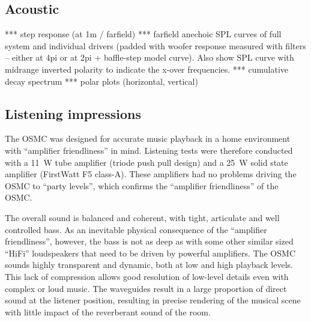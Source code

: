 \documentclass[12pt,a4paper]{article}
\begin{document}
\subsection{Acoustic}
*** step response (at 1m / farfield)
*** farfield anechoic SPL curves of full system and individual drivers (padded with woofer response measured with filters -- either at 4pi or at 2pi + baffle-step model curve). Also show SPL curve with midrange inverted polarity to indicate the x-over frequencies.
*** cumulative decay spectrum
*** polar plots (horizontal, vertical)


\subsection{Listening impressions}
The OSMC was designed for accurate music playback in a home environment with ``amplifier friendliness'' in mind. Listening tests were therefore conducted with a \SI{11}{W} tube amplifier (triode push pull design) and a \SI{25}{W} solid state amplifier (FirstWatt F5 class-A). These amplifiers had no problems driving the OSMC to ``party levels'', which confirms the ``amplifier friendliness'' of the OSMC.\par

The overall sound is balanced and coherent, with tight, articulate and well controlled bass. As an inevitable physical consequence of the ``amplifier friendliness'', however, the bass is not as deep as with some other similar sized ``HiFi'' loudspeakers that need to be driven by powerful amplifiers. The OSMC sounds highly transparent and dynamic, both at low and high playback levels. This lack of compression allows good resolution of low-level details even with complex or loud music. The waveguides result in a large proportion of direct sound at the listener position, resulting in precise rendering of the musical scene with little impact of the reverberant sound of the room.

\clearpage



\end{document}

